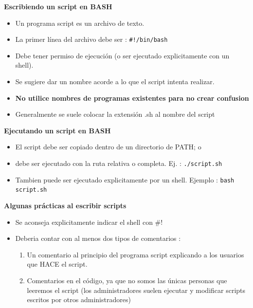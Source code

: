 \documentclass{beamer}
\begin{document}
\begin{frame}{}
\textbf{Escribiendo un script en BASH }
\begin{itemize}
\item Un programa script es un archivo de texto.
\item La primer línea del archivo debe ser : \texttt{\#!/bin/bash}
\item Debe tener permiso de ejecución (o ser ejecutado explicitamente con un shell).
\item Se sugiere dar un nombre acorde a lo que el script intenta realizar.
\item \textbf{No utilice nombres de programas existentes para no crear confusion}
\item Generalmente se suele colocar la extensión .sh al nombre del script
\end{itemize}
\end{frame}

\begin{frame}{}
\textbf{Ejecutando un script en BASH }
\begin{itemize}
\item El script debe ser copiado dentro de un directorio de PATH; o
\item debe ser ejecutado con la ruta relativa o completa. Ej. : \texttt{./script.sh}
\item Tambien puede ser ejecutado explicitamente por un shell. Ejemplo : \texttt{bash script.sh}
\end{itemize}

\end{frame}

\begin{frame}{}
\textbf{Algunas prácticas al escribir scripts }
\begin{itemize}
\item Se aconseja explicitamente indicar el shell con \#!
\item Deberia contar con al menos dos tipos de comentarios :
\begin{enumerate}
\item Un comentario al principio del programa script explicando a los usuarios que HACE el script.
\item Comentarios en el código, ya que no somos las únicas personas que leeremos el script 
(los administradores suelen ejecutar y modificar scripts escritos por otros administradores)
\end{enumerate}
\end{itemize}

\end{frame}
\end{document}
